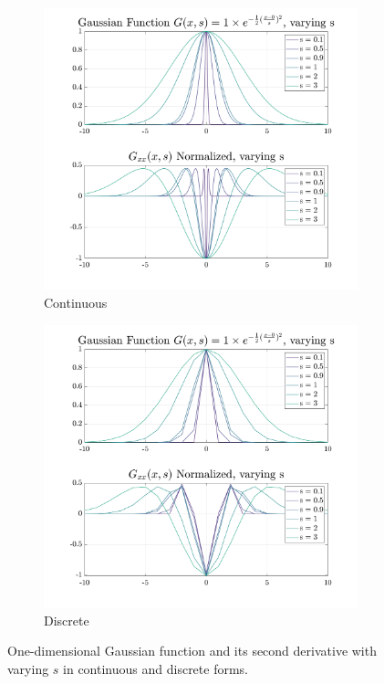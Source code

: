 \documentclass{edger}
\begin{document}
\begin{figure}[!h]
\centering
    \begin{subfigure}[b]{0.5\textwidth}            

            \includegraphics[width=\textwidth]{gaussian_continuous.png}
            \caption{Continuous}
            \label{fig:Gaussian cont}
    \end{subfigure}%
    \begin{subfigure}[b]{0.5\textwidth}
            \centering
            \includegraphics[width=\textwidth]{gaussian_discrete.png}
            \caption{Discrete}
            \label{fig:Gaussian disc}
    \end{subfigure}
    \caption{One-dimensional Gaussian function and  its second derivative with varying $s$ in continuous and discrete forms.}
    \label{fig:Gaussian function}
\end{figure}
\end{document}
